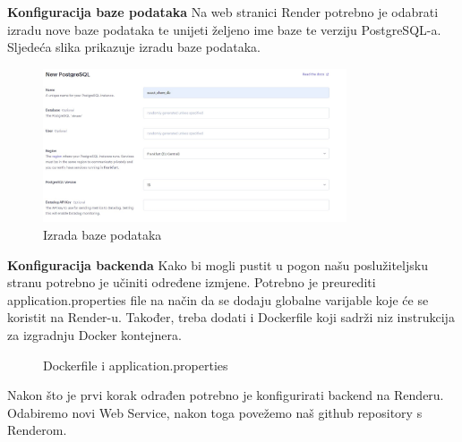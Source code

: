 		\textbf{Konfiguracija baze podataka}\newline
		Na web stranici Render potrebno je odabrati izradu nove baze podataka te unijeti željeno ime baze te verziju PostgreSQL-a. Sljedeća slika prikazuje izradu baze podataka.
		\begin{figure}[h]
			\centering
			\includegraphics[width=0.8\textwidth]{slike/pustanju_u_pogon_1.jpg}
			\caption{Izrada baze podataka}
			\label{fig:baza podataka}
		\end{figure}
		
		
		\textbf{Konfiguracija backenda}\newline
		Kako bi mogli pustit u pogon našu poslužiteljsku stranu potrebno je učiniti određene izmjene. Potrebno je preurediti application.properties file na način da se dodaju globalne varijable koje će se koristit na Render-u. Također, treba dodati i Dockerfile koji sadrži niz instrukcija za izgradnju Docker kontejnera. 
		
		\begin{figure}
			\centering
			\caption{Dockerfile i application.properties}
			\label{fig:dockerfile_application.properties}
		\end{figure}
		
		Nakon što je prvi korak odrađen potrebno je konfigurirati backend na Renderu. Odabiremo novi Web Service, nakon toga povežemo naš github repository s Renderom. 
		
